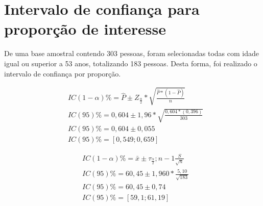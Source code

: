 \chapter{Intervalo de confiança para proporção de interesse}

    De uma base amostral contendo 303 pessoas, foram selecionadas todas com idade
    igual ou superior a 53 anos, totalizando 183 pessoas. Desta forma, foi realizado 
    o intervalo de confiança por proporção.
    
    \begin{equation} \label{eq1}
    \begin{split}
    & IC(1-\alpha)\%= \hat{P} \pm Z_\frac{\alpha}{2} * \sqrt{\frac{\hat{P}*(1-\hat{P})}{n}} \\
    & IC(95)\% = 0,604 \pm 1,96 * \sqrt{\frac{0,604*(0,396)}{303}} \\
    & IC(95)\% = 0,604 \pm 0,055 \\
    & IC(95)\% = [0,549 ; 0,659] 
    \end{split}
    \end{equation}
    
    \begin{equation} \label{eq2}
    \begin{split}
    & IC(1-\alpha)\%= \bar{x} \pm \tau_\frac{\alpha}{2};n-1 \frac{S}{\sqrt{n}} \\
    & IC(95)\% = 60,45 \pm 1,960 * \frac{5,10}{\sqrt{183}} \\
    & IC(95)\% = 60,45 \pm 0,74 \\
    & IC(95)\% = [59,1 ; 61,19] 
    \end{split}
    \end{equation}



